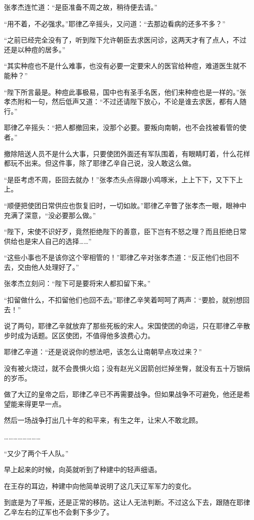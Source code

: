 张孝杰连忙道：“是臣准备不周之故，稍待便去请。”

“用不着，不必强求。”耶律乙辛摇头，又问道：“去那边看病的还多不多？”

“之前已经完全没有了，听到陛下允许朝臣去求医问诊，这两天才有了点人，不过还是以种痘的居多。”

“其实种痘也不是什么难事，也没有必要一定要宋人的医官给种痘，难道医生就不能种？”

“陛下所言最是。种痘此事极易，国中也有圣手名医，他们来种痘也是一样的。”张孝杰附和一句，然后低声又道：“不过还请陛下放心，不论是谁去求医，都有人随行。”

耶律乙辛摇头：“把人都撤回来，没那个必要。要叛向南朝，也不会找被看管的使者。”

撤除陪送人员不是什么大事，只要使团外面还有军队围着，有眼睛盯着，什么花样都玩不出来。但这件事，除了耶律乙辛自己说，没人敢这么做。

“是臣考虑不周，臣回去就办！”张孝杰头点得跟小鸡啄米，上上下下，又下下上上。

“顺便把使团日常供应也恢复旧时，一切如故。”耶律乙辛瞥了张孝杰一眼，眼神中充满了深意，“没必要那么做。”

“陛下，宋使不识好歹，竟然拒绝陛下的善意，臣下岂有不怒之理？而且拒绝日常供给也是宋人自己的选择……”

“这些小事也不是该你这个宰相管的！”耶律乙辛对张孝杰道：“反正他们也回不去，交由他人处理好了。”

张孝杰立刻问：“陛下可是要将宋人都扣留下来。”

“扣留做什么，不扣留他们也回不去。”耶律乙辛笑着呵呵了两声：“要脸，就别想回去！”

说了两句，耶律乙辛就放弃了那些死板的宋人。宋国使团的命运，只在耶律乙辛散步时成为话题。区区使团，不值得他多浪费心力。

耶律乙辛道：“还是说说你的想法吧，该怎么让南朝早点攻过来？”

没有被火烧过，就不会畏惧火焰；没有赵光义因箭创烂掉坐臀，就没有五十万银绢的岁币。

做了大辽的皇帝之后，耶律乙辛已不再需要战争。但如果战争不可避免，他还是希望能来得更早一点。

然后一场战争打出几十年的和平来，有生之年，让宋人不敢北顾。

……………………

“又少了两个千人队。”

早上起来的时候，向英就听到了种建中的轻声细语。

在王存的耳边，种建中向他简单说明了这几天辽军军力的变化。

到底是为了平叛，还是正常的移防。这让人无法判断。不过这么下去，跟随在耶律乙辛左右的辽军也不会剩下多少了。

